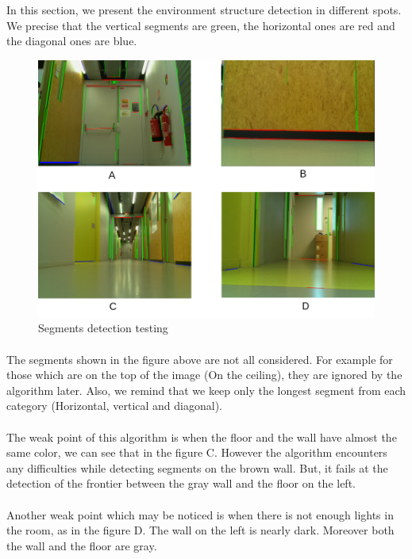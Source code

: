 \documentclass[12pt]{report}
\begin{document}
	In this section, we present the environment structure detection in different spots. We precise that the vertical segments are green, the horizontal ones are red and the diagonal ones are blue.
		\begin{figure}[H]
		\begin{center}
			\includegraphics[scale=0.70]{res/img_proc.png}
			\caption{Segments detection testing}
		\end{center}
	\end{figure}
	\paragraph{}
	The segments shown in the figure above are not all considered. For example for those which are on the top of the image (On the ceiling), they are ignored by the algorithm later. Also, we remind that we keep only the longest segment from each category (Horizontal, vertical and diagonal).
	\paragraph{}
	The weak point of this algorithm is when the floor and the wall have almost the same color, we can see that in the figure C. However the algorithm encounters any difficulties while detecting segments on the brown wall. But, it fails at the detection of the frontier between the gray wall and the floor on the left.
	
	\paragraph{}
	Another weak point which may be noticed is when there is not enough lights in the room, as in the figure D. The wall on the left is nearly dark. Moreover both the wall and the floor are gray.
	
\end{document}
